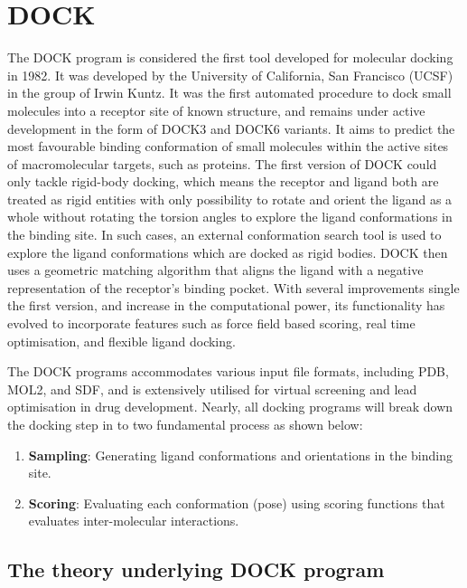 \documentclass[12pt, a4paper]{article}
\begin{document}
\section{DOCK}
The DOCK program is considered the first tool developed for molecular docking in 1982\cite{CH7_Kuntz1982}. It was developed by the University of California, San Francisco (UCSF) in the group of Irwin Kuntz. It was the first automated procedure to dock small molecules into a receptor site of known structure, and remains under active development in the form of DOCK3 and DOCK6 variants\cite{CH7_Meng1992Grid,CH7_Allen2015,CH7_Brozell2012}. It aims to predict the most favourable binding conformation of small molecules within the active sites of macromolecular targets, such as proteins. The first version of DOCK could only tackle rigid-body docking, which means the receptor and ligand both are treated as rigid entities with only possibility to rotate and orient the ligand as a whole without rotating the torsion angles to explore the ligand conformations in the binding site. In such cases, an external conformation search tool is used to explore the ligand conformations which are docked as rigid bodies. DOCK then uses a geometric matching algorithm that aligns the ligand with a negative representation of the receptor's binding pocket. With several improvements single the first version, and increase in the computational power, its functionality has evolved to incorporate features such as force field based scoring, real time optimisation, and flexible ligand docking. 

The DOCK programs accommodates various input file formats, including PDB, MOL2, and SDF, and is extensively utilised for virtual screening and lead optimisation in drug development. Nearly, all docking programs will break down the docking step in to two fundamental process as shown below: 
\begin{enumerate}
  \item \textbf{Sampling}: Generating ligand conformations and orientations in the binding site.
  \item \textbf{Scoring}: Evaluating each conformation (pose) using scoring functions that evaluates inter-molecular interactions.
\end{enumerate}


\subsection{The theory underlying DOCK program}
\end{document}
